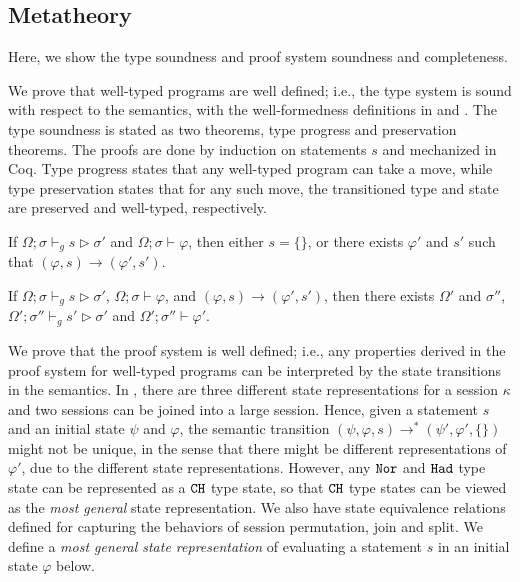\subsection{\qafny Metatheory}\label{sec:theorems}

Here, we show the type soundness and proof system soundness and completeness.

We prove that well-typed \qafny programs are well defined; i.e., the
type system is sound with respect to the semantics, with the well-formedness definitions in  and .
The \qafny type soundness is stated as two theorems, type progress and preservation theorems. The proofs are done by induction on \qafny statements $s$ and mechanized in Coq. Type progress states that any well-typed \qafny program can take a move, while type preservation states that for any such move, the transitioned type and state are preserved and well-typed, respectively.

\begin{theorem}\label{thm:type-progress-oqasm}\rm 
If $\Omega;\sigma \vdash_g s \triangleright \sigma'$ and $\Omega;\sigma \vdash \varphi$, then either $s=\{\}$, or there exists $\varphi'$ and $s'$ such that $(\varphi,s)\longrightarrow (\varphi',s')$.
\end{theorem}

\begin{theorem}\label{thm:type-preservation-oqasm}\rm 
If $\Omega;\sigma \vdash_g s \triangleright \sigma'$, $\Omega;\sigma \vdash \varphi$, and $(\varphi,s)\longrightarrow (\varphi',s')$, then 
there exists $\Omega'$ and $\sigma''$, $\Omega';\sigma'' \vdash_g s' \triangleright \sigma'$ and $\Omega';\sigma'' \vdash \varphi'$.
\end{theorem}

We prove that the \qafny proof system is well defined; i.e., any properties derived in the \qafny proof system for well-typed \qafny programs can be interpreted by the state transitions in the \qafny semantics.
In \qafny, there are three different state representations for a session $\kappa$ and two sessions can be joined into a large session.
Hence, given a statement $s$ and an initial state $\psi$ and $\varphi$, the semantic transition $(\psi, \varphi,s) \longrightarrow^{*} (\psi',\varphi',\{\})$ might not be unique, in the sense that there might be different representations of $\varphi'$, due to the different state representations.
However, any $\texttt{Nor}$ and $\texttt{Had}$ type state can be represented as a $\texttt{CH}$ type state, so that $\texttt{CH}$ type states can be viewed as the \emph{most general} state representation. We also have state equivalence relations defined for capturing the behaviors of session permutation, join and split. We define a \emph{most general state representation} of evaluating a statement $s$ in an initial state $\varphi$ below.


